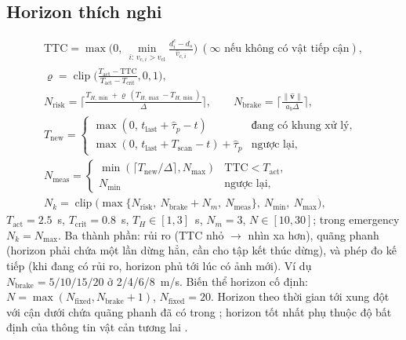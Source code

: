 \documentclass[11pt,a4paper]{article}
\numberwithin{equation}{section}
\newcommand{\vb}[1]{\bm{#1}}
\newcommand{\clip}{\operatorname{clip}}
\theoremstyle{definition}
\theoremstyle{plain}
\theoremstyle{remark}
\begin{document}
\subsection{Horizon thích nghi}
\label{sec:horizon}
\begin{gather}
\text{TTC}=\max\Big(0,\ \min_{i:\,v_{c,i}>v_{\text{cl}}}\frac{d^c_i-d_s}{\bar v_{c,i}}\Big)\ (\infty\text{ nếu không có vật tiếp cận}),\nonumber\\
\varrho=\clip\Big(\frac{T_{\text{act}}-\text{TTC}}{T_{\text{act}}-T_{\text{crit}}},0,1\Big), \label{eq:risk}\\
N_{\text{risk}}=\Big\lceil\frac{T_{H,\min}+\varrho\,(T_{H,\max}-T_{H,\min})}{\Delta}\Big\rceil,\qquad
N_{\text{brake}}=\Big\lceil\frac{\|\hat{\vb v}\|}{a_b\Delta}\Big\rceil, \label{eq:Nrisk}\\
T_{\text{new}}=\begin{cases}\max(0,\,t_{\text{last}}+\hat\tau_p-t) & \text{đang có khung xử lý},\\ \max(0,\,t_{\text{last}}+T_{\text{scan}}-t)+\hat\tau_p & \text{ngược lại},\end{cases}\label{eq:Tnew0}\\
N_{\text{meas}}=\begin{cases}\min(\lceil T_{\text{new}}/\Delta\rceil,N_{\max}) & \text{TTC}<T_{\text{act}},\\ N_{\min} & \text{ngược lại},\end{cases} \label{eq:Tnew}\\
N_k=\clip\big(\max\{N_{\text{risk}},\ N_{\text{brake}}+N_m,\ N_{\text{meas}}\},\ N_{\min},\ N_{\max}\big), \label{eq:N}
\end{gather}
$T_{\text{act}}=2.5$~s, $T_{\text{crit}}=0.8$~s, $T_{H}\in[1,3]$~s, $N_m=3$, $N\in[10,30]$; trong emergency $N_k=N_{\max}$. Ba thành phần: rủi ro (TTC nhỏ $\to$ nhìn xa hơn), quãng phanh (horizon phải chứa một lần dừng hẳn, cần cho tập kết thúc dừng), và phép đo kế tiếp (khi đang có rủi ro, horizon phủ tới lúc có ảnh mới). Ví dụ $N_{\text{brake}}=5/10/15/20$ ở 2/4/6/8~m/s. Biến thể horizon cố định: $N=\max(N_{\text{fixed}},N_{\text{brake}}+1)$, $N_{\text{fixed}}=20$. Horizon theo thời gian tới xung đột với cận dưới chứa quãng phanh đã có trong \cite{mumken2026}; horizon tốt nhất phụ thuộc độ bất định của thông tin vật cản tương lai \cite{bohn2021}.
\end{document}
